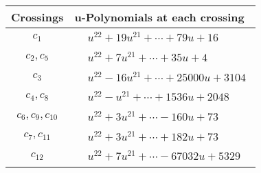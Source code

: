 \documentclass[1p]{elsarticle_modified}
\theoremstyle{definition}
\begin{document}
\begin{tabular}{m{50pt}|m{274pt}}
Crossings & \hspace{64pt}u-Polynomials at each crossing \\
\hline $$\begin{aligned}c_{1}\end{aligned}$$&$\begin{aligned}
&u^{22}+19 u^{21}+\cdots+79 u+16
\end{aligned}$\\
\hline $$\begin{aligned}c_{2},c_{5}\end{aligned}$$&$\begin{aligned}
&u^{22}+7 u^{21}+\cdots+35 u+4
\end{aligned}$\\
\hline $$\begin{aligned}c_{3}\end{aligned}$$&$\begin{aligned}
&u^{22}-16 u^{21}+\cdots+25000 u+3104
\end{aligned}$\\
\hline $$\begin{aligned}c_{4},c_{8}\end{aligned}$$&$\begin{aligned}
&u^{22}- u^{21}+\cdots+1536 u+2048
\end{aligned}$\\
\hline $$\begin{aligned}c_{6},c_{9},c_{10}\end{aligned}$$&$\begin{aligned}
&u^{22}+3 u^{21}+\cdots-160 u+73
\end{aligned}$\\
\hline $$\begin{aligned}c_{7},c_{11}\end{aligned}$$&$\begin{aligned}
&u^{22}+3 u^{21}+\cdots+182 u+73
\end{aligned}$\\
\hline $$\begin{aligned}c_{12}\end{aligned}$$&$\begin{aligned}
&u^{22}+7 u^{21}+\cdots-67032 u+5329
\end{aligned}$\\
\hline
\end{tabular}\\~\\
\newpage\renewcommand{\arraystretch}{1}
\end{document}
